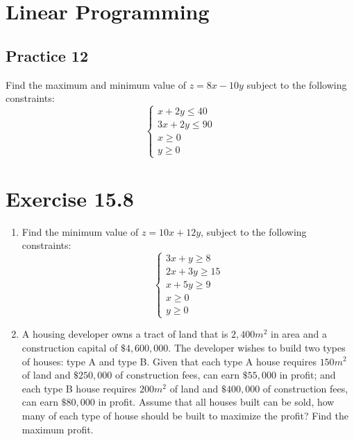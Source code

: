 \documentclass{report}
\begin{document}
\begin{multicols}{2}
    \section{Linear Programming}

    \subsection{Practice 12}
    Find the maximum and minimum value of $z = 8x - 10y$ subject to the following
    constraints: \[\begin{cases}
            x + 2y \leq 40  \\
            3x + 2y \leq 90 \\
            x \geq 0        \\
            y \geq 0
        \end{cases}\]

    \section{Exercise 15.8}
    \begin{enumerate}
        \item Find the minimum value of $z = 10x + 12y$, subject to the following
              constraints: \[\begin{cases}
                      3x + y \geq 8   \\
                      2x + 3y \geq 15 \\
                      x + 5y \geq 9   \\
                      x \geq 0        \\
                      y \geq 0
                  \end{cases}\]
        \item A housing developer owns a tract of land that is $2,400 m^2$ in area and a
              construction capital of $\$4,600,000$. The developer wishes to build two types
              of houses: type A and type B. Given that each type A house requires $150 m^2$
              of land and $\$250,000$ of construction fees, can earn $\$55,000$ in profit;
              and each type B house requires $200 m^2$ of land and $\$400,000$ of
              construction fees, can earn $\$80,000$ in profit. Assume that all houses built
              can be sold, how many of each type of house should be built to maximize the
              profit? Find the maximum profit.


\end{enumerate}
\end{multicols}
\end{document}
